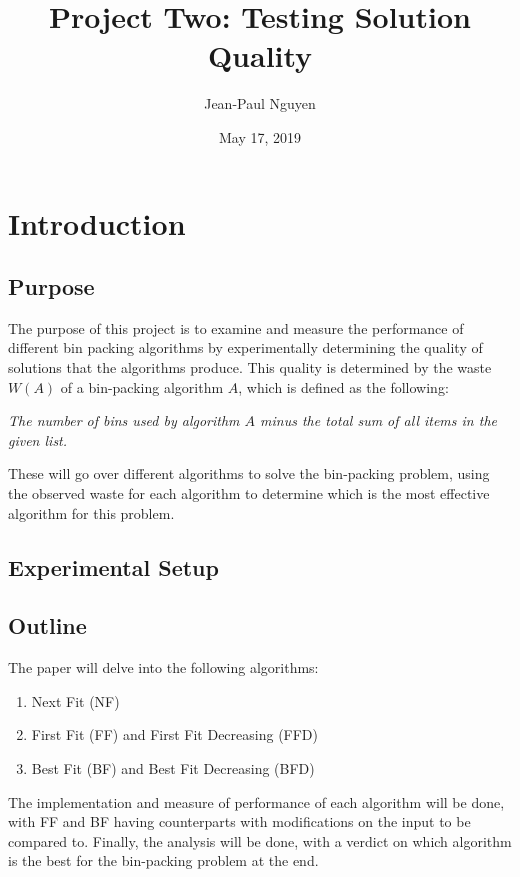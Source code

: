 \documentclass{article}
\title{Project Two: Testing Solution Quality}
\author{Jean-Paul Nguyen}
\date{May 17, 2019}
\begin{document}
\maketitle

\newcommand{\nextblurb}[0]{\vspace{1 em} \newline \noindent}

\section{Introduction}
\subsection{Purpose}
    The purpose of this project is to examine and measure the performance of
    different bin packing algorithms by experimentally determining the quality 
    of solutions that the algorithms produce. This quality is determined by
    the waste $W(A)$ of a bin-packing algorithm $A$, which is defined as the 
    following:
    \begin{center}
        \textit{The number of bins used by algorithm $A$ minus the total sum of 
        all items in the given list.}
    \end{center}
    These will go over different algorithms to solve the bin-packing problem,
    using the observed waste for each algorithm to determine which is the most
    effective algorithm for this problem.
\subsection{Experimental Setup}
\subsection{Outline}
    The paper will delve into the following algorithms:
    \begin{enumerate}
        \item Next Fit (NF)
        \item First Fit (FF) and First Fit Decreasing (FFD)
        \item Best Fit (BF) and Best Fit Decreasing (BFD)
    \end{enumerate}
    \noindent The implementation and measure of performance of each algorithm 
    will be done, with FF and BF having counterparts with modifications on the 
    input to be compared to. Finally, the analysis will be done, with a verdict
    on which algorithm is the best for the bin-packing problem at the end.
\end{document}
